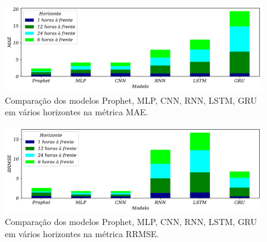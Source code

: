 \begin{figure}[H]
	\centering
	\caption{Comparação dos modelos Prophet, MLP, CNN, RNN, LSTM, GRU em vários horizontes na métrica MAE.}\label{fig:modelos-red}
	\includegraphics[width=0.9\linewidth]{Resultados/Figuras/mae_comparar}
	
	
\end{figure}



\begin{figure}[H]
	\centering
	\caption{Comparação dos modelos Prophet, MLP, CNN, RNN, LSTM, GRU em vários horizontes na métrica RRMSE.}\label{fig:modelos-red2}
	\includegraphics[width=0.9\linewidth]{Resultados/Figuras/rrmse_comparar}
	
	
\end{figure}




%	



